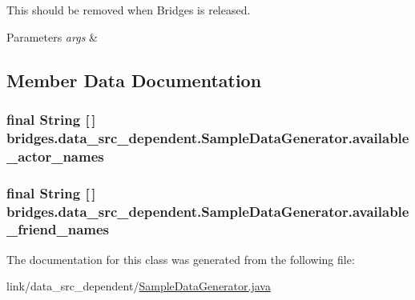 This should be removed when Bridges is released. 
\begin{DoxyParams}{Parameters}
{\em args} & \\
\hline
\end{DoxyParams}


\subsection{Member Data Documentation}
\hypertarget{classbridges_1_1data__src__dependent_1_1_sample_data_generator_aac86cadaeb8859e94b6ed47a066cbbfc}{}
\subsubsection[{available\+\_\+actor\+\_\+names}]{\setlength{\rightskip}{0pt plus 5cm}final String \mbox{[}$\,$\mbox{]} bridges.\+data\+\_\+src\+\_\+dependent.\+Sample\+Data\+Generator.\+available\+\_\+actor\+\_\+names\hspace{0.3cm}{\ttfamily [static]}}\label{classbridges_1_1data__src__dependent_1_1_sample_data_generator_aac86cadaeb8859e94b6ed47a066cbbfc}
\hypertarget{classbridges_1_1data__src__dependent_1_1_sample_data_generator_a304c946018534a5a2b0049aace9d4472}{}
\subsubsection[{available\+\_\+friend\+\_\+names}]{\setlength{\rightskip}{0pt plus 5cm}final String \mbox{[}$\,$\mbox{]} bridges.\+data\+\_\+src\+\_\+dependent.\+Sample\+Data\+Generator.\+available\+\_\+friend\+\_\+names\hspace{0.3cm}{\ttfamily [static]}}\label{classbridges_1_1data__src__dependent_1_1_sample_data_generator_a304c946018534a5a2b0049aace9d4472}


The documentation for this class was generated from the following file\+:\begin{DoxyCompactItemize}
\item 
link/data\+\_\+src\+\_\+dependent/\hyperlink{_sample_data_generator_8java}{Sample\+Data\+Generator.\+java}\end{DoxyCompactItemize}
